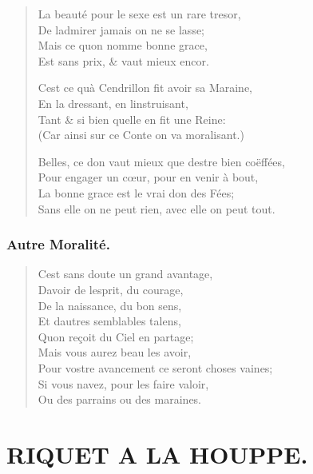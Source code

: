 \documentclass[14pt,a4paper]{memoir}
\newcommand{\notechapter}[1]{%
  \addtonotes{\protect\section*{#1}}%
}
\begin{document}
{{\begin{otherlanguage}{french}
\begin{verse}
  \small
La beauté pour le sexe est un rare tresor, \\
De l\textquotesingle admirer jamais on ne se lasse; \\
Mais ce qu\textquotesingle on nomme bonne grace, \\
Est sans prix, \& vaut mieux encor.

C\textquotesingle est ce qu\textquotesingle à Cendrillon fit avoir sa Maraine,  \\
En la dressant, en l\textquotesingle instruisant, \\
Tant \& si bien qu\textquotesingle elle en fit une Reine: \\
(Car ainsi sur ce Conte on va moralisant.)

Belles, ce don vaut mieux que d\textquotesingle estre bien coëffées, \\
Pour engager un cœur, pour en venir à bout,  \\
La bonne grace est le vrai don des Fées; \\
Sans elle on ne peut rien, avec elle on peut tout.
\end{verse}

\subsection{Autre Moralité.}

\begin{verse}
  \small
C\textquotesingle est sans doute un grand avantage, \\
D\textquotesingle avoir de l\textquotesingle esprit, du courage, \\
De la naissance, du bon sens, \\
Et d\textquotesingle autres semblables talens, \\
Qu\textquotesingle on reçoit du Ciel en partage; \\
Mais vous aurez beau les avoir, \\
Pour vostre avancement ce seront choses vaines;  \\
Si vous n\textquotesingle avez, pour les faire valoir, \\
Ou des parrains ou des maraines.
\end{verse}

\chapter{RIQUET A LA HOUPPE.}
\notechapter{RIQUET A LA HOUPPE.}


\end{otherlanguage}}}
\end{document}
